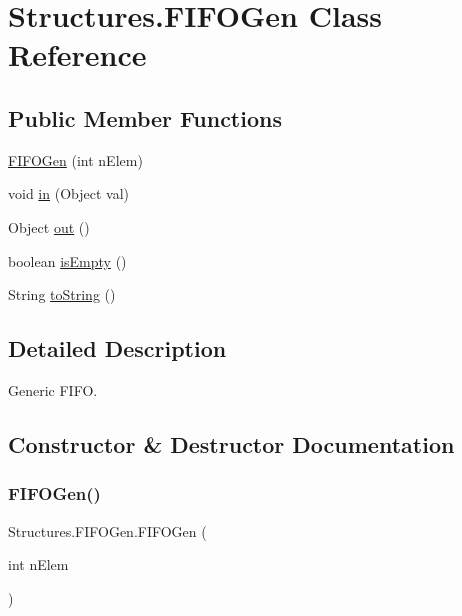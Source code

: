 \hypertarget{class_structures_1_1_f_i_f_o_gen}{}\section{Structures.\+F\+I\+F\+O\+Gen Class Reference}
\label{class_structures_1_1_f_i_f_o_gen}
\subsection*{Public Member Functions}
\begin{DoxyCompactItemize}
\item 
\hyperlink{class_structures_1_1_f_i_f_o_gen_a79132f0c7d3fbecef239a1e6988381a7}{F\+I\+F\+O\+Gen} (int n\+Elem)
\item 
void \hyperlink{class_structures_1_1_f_i_f_o_gen_a8ec114330d8c542df57d58886ecb2196}{in} (Object val)
\item 
Object \hyperlink{class_structures_1_1_f_i_f_o_gen_ac21638f2f22f36450c241d5f5dc665bb}{out} ()
\item 
boolean \hyperlink{class_structures_1_1_f_i_f_o_gen_a55ae00dc84a01ec42237fa0ea8a088c5}{is\+Empty} ()
\item 
String \hyperlink{class_structures_1_1_f_i_f_o_gen_a89179a1589f53d69033309e302df2d4e}{to\+String} ()
\end{DoxyCompactItemize}


\subsection{Detailed Description}
Generic F\+I\+FO. 

\subsection{Constructor \& Destructor Documentation}
\mbox{\label{class_structures_1_1_f_i_f_o_gen_a79132f0c7d3fbecef239a1e6988381a7}} 
\subsubsection{\texorpdfstring{F\+I\+F\+O\+Gen()}{FIFOGen()}}
{\footnotesize\ttfamily Structures.\+F\+I\+F\+O\+Gen.\+F\+I\+F\+O\+Gen (\begin{DoxyParamCaption}\item[{int}]{n\+Elem }\end{DoxyParamCaption})}

